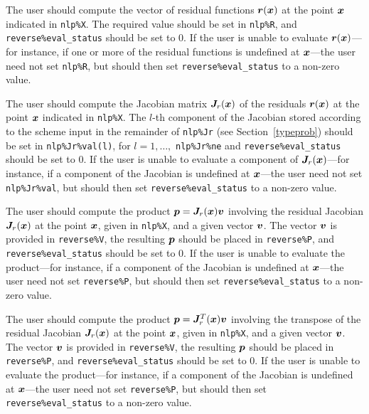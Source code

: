 \documentclass{galahad}
\begin{document}
\begin{description}
 The user should compute the vector of residual functions
     ${\bm{r}}({\bm{x}})$ at the point ${\bm{x}}$ indicated in {\tt nlp\%X}.
     The required value should be set in {\tt nlp\%R}, and
     {\tt reverse\%eval\_status} should be set to 0. If the user is
     unable to evaluate ${\bm{r}}({\bm{x}})$---for instance, if one or more of the
     residual functions is undefined at ${\bm{x}}$---the user need not set
     {\tt nlp\%R}, but should then set {\tt reverse\%eval\_status}
     to a non-zero value.

 The user should compute the Jacobian matrix ${\bm{J}}_r({\bm{x}})$ of the
     residuals ${\bm{r}}({\bm{x}})$ at the point ${\bm{x}}$ indicated in {\tt nlp\%X}.
     The $l$-th component of the Jacobian stored according to the scheme
     input in the remainder of {\tt nlp\%Jr} (see Section~\ref{typeprob})
     should be set in {\tt nlp\%Jr\%val(l)}, for $l = 1, \ldots,$
     {\tt  nlp\%Jr\%ne} and {\tt reverse\%eval\_status} should be set to 0.
     If the user is unable to  evaluate a component of ${\bm{J}}_r({\bm{x}})$---for
     instance, if a component of the Jacobian is
     undefined at ${\bm{x}}$---the user need not set {\tt nlp\%Jr\%val}, but
     should then set {\tt reverse\%eval\_status} to a non-zero value.

 The user should compute the product ${\bm{p}} = {\bm{J}}_r({\bm{x}}) {\bm{v}}$
     involving the residual Jacobian ${\bm{J}}_r({\bm{x}})$ at the point ${\bm{x}}$, given
     in {\tt nlp\%X}, and a given vector ${\bm{v}}$.
     The vector ${\bm{v}}$ is provided in {\tt reverse\%V},
     the resulting ${\bm{p}}$ should be placed in {\tt reverse\%P},
     and  {\tt reverse\%eval\_status} should be set to 0. If the user is
     unable to evaluate the product---for instance, if a component of the 
     Jacobian is undefined at ${\bm{x}}$---the user need not set {\tt reverse\%P}, 
     but should then set {\tt reverse\%eval\_status} to a non-zero value.

 The user should compute the product ${\bm{p}} = {\bm{J}}_r^T({\bm{x}}) {\bm{v}}$ 
     involving the transpose of the residual Jacobian ${\bm{J}}_r({\bm{x}})$ 
     at the point ${\bm{x}}$, given in {\tt nlp\%X}, and a given vector ${\bm{v}}$.
     The vector ${\bm{v}}$ is provided in {\tt reverse\%V},
     the resulting ${\bm{p}}$ should be placed in {\tt reverse\%P},
     and  {\tt reverse\%eval\_status} should be set to 0. If the user is
     unable to evaluate the product---for instance, if a component of the 
     Jacobian is undefined at ${\bm{x}}$---the user need not set {\tt reverse\%P}, 
     but should then set {\tt reverse\%eval\_status} to a non-zero value.


\end{description}
\end{document}
